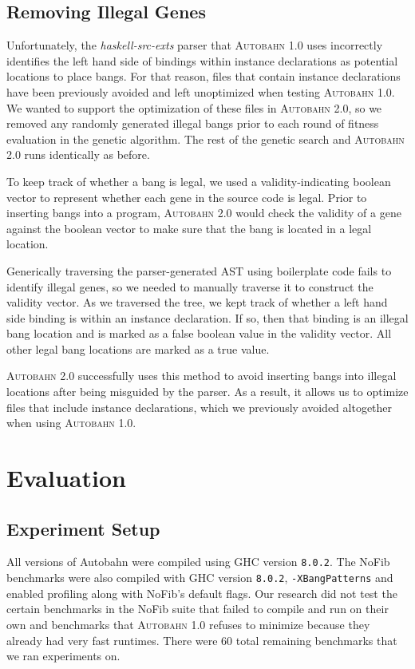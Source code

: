 \documentclass[format=sigplan, review=true]{acmart}
\newcommand{\Ao}[0]{\textsc{Autobahn 1.0}}
\newcommand{\At}[0]{\textsc{Autobahn 2.0}}
\begin{document}
\subsection{Removing Illegal Genes}

Unfortunately, the \textit{haskell-src-exts} parser that \Ao{} uses incorrectly identifies the left hand side of bindings within instance declarations as potential locations to place bangs. For that reason, files that contain instance declarations have been previously avoided and left unoptimized when testing \Ao{}. We wanted to support the optimization of these files in \At{}, so we removed any randomly generated illegal bangs prior to each round of fitness evaluation in the genetic algorithm. The rest of the genetic search and \At{} runs identically as before.

To keep track of whether a bang is legal, we used a validity-indicating boolean vector to represent whether each gene in the source code is legal. Prior to inserting bangs into a program, \At{} would check the validity of a gene against the boolean vector to make sure that the bang is located in a legal location.

Generically traversing the parser-generated AST using boilerplate code fails to identify illegal genes, so we needed to manually traverse it to construct the validity vector. As we traversed the tree, we kept track of whether a left hand side binding is within an instance declaration. If so, then that binding is an illegal bang location and is marked as a false boolean value in the validity vector. All other legal bang locations are marked as a true value.

\At{} successfully uses this method to avoid inserting bangs into illegal locations after being misguided by the parser. As a result, it allows us to optimize files that include instance declarations, which we previously avoided altogether when using \Ao{}. 

\section{Evaluation}

\subsection{Experiment Setup}

All versions of Autobahn were compiled using GHC version \texttt{8.0.2}. The NoFib benchmarks were also compiled with GHC version \texttt{8.0.2}, \texttt{-XBangPatterns} and enabled profiling along with NoFib's default flags. Our research did not test the certain benchmarks in the NoFib suite that failed to compile and run on their own and benchmarks that \Ao{} refuses to minimize because they already had very fast runtimes. There were 60 total remaining benchmarks that we ran experiments on.
\end{document}
